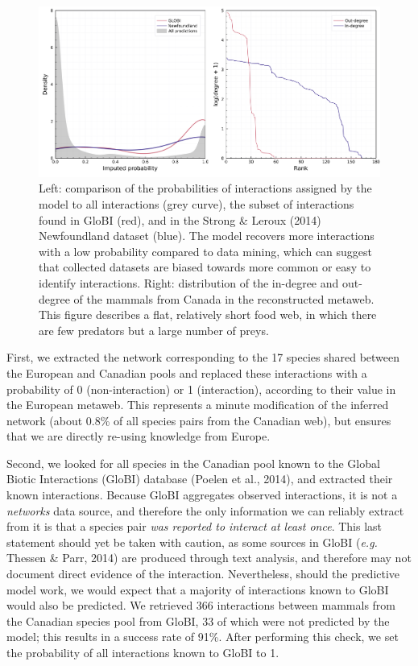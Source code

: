 \documentclass[10pt,oneside]{article}
\makeatletter
\def\maxwidth{\ifdim\Gin@nat@width>\linewidth\linewidth
\else\Gin@nat@width\fi}
\let\Oldincludegraphics\includegraphics
\renewcommand{\includegraphics}[1]{\Oldincludegraphics[width=\maxwidth]{#1}}
\makeatother
\begin{document}
\begin{figure}
\hypertarget{fig:inflation}{%
\centering
\includegraphics{figures/figure-validation.png}
\caption{Left: comparison of the probabilities of interactions assigned
by the model to all interactions (grey curve), the subset of
interactions found in GloBI (red), and in the Strong \& Leroux (2014)
Newfoundland dataset (blue). The model recovers more interactions with a
low probability compared to data mining, which can suggest that
collected datasets are biased towards more common or easy to identify
interactions. Right: distribution of the in-degree and out-degree of the
mammals from Canada in the reconstructed metaweb. This figure describes
a flat, relatively short food web, in which there are few predators but
a large number of preys.}\label{fig:inflation}
}
\end{figure}

First, we extracted the network corresponding to the 17 species shared
between the European and Canadian pools and replaced these interactions
with a probability of 0 (non-interaction) or 1 (interaction), according
to their value in the European metaweb. This represents a minute
modification of the inferred network (about 0.8\% of all species pairs
from the Canadian web), but ensures that we are directly re-using
knowledge from Europe.

Second, we looked for all species in the Canadian pool known to the
Global Biotic Interactions (GloBI) database (Poelen et al., 2014), and
extracted their known interactions. Because GloBI aggregates observed
interactions, it is not a \emph{networks} data source, and therefore the
only information we can reliably extract from it is that a species pair
\emph{was reported to interact at least once}. This last statement
should yet be taken with caution, as some sources in GloBI (\emph{e.g.}
Thessen \& Parr, 2014) are produced through text analysis, and therefore
may not document direct evidence of the interaction. Nevertheless,
should the predictive model work, we would expect that a majority of
interactions known to GloBI would also be predicted. We retrieved 366
interactions between mammals from the Canadian species pool from GloBI,
33 of which were not predicted by the model; this results in a success
rate of 91\%. After performing this check, we set the probability of all
interactions known to GloBI to 1.
\end{document}
